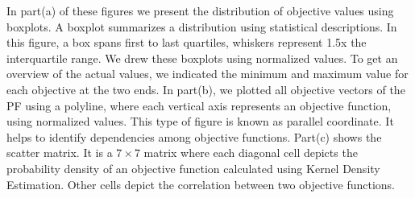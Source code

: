 In part(a) of these figures we present the distribution of objective values using boxplots. A boxplot summarizes a distribution using statistical descriptions. In this figure, a box spans first to last quartiles, whiskers represent 1.5x the interquartile range. We drew these boxplots using normalized values. To get an overview of the actual values, we indicated the minimum and maximum value for each objective at the two ends. In part(b), we plotted all objective vectors of the PF using a polyline, where each vertical axis represents an objective function, using normalized values. This type of figure is known as parallel coordinate. It helps to identify dependencies among objective functions. Part(c) shows the scatter matrix. It is a $7\times7$ matrix where each diagonal cell depicts the probability density of an objective function calculated using Kernel Density Estimation. Other cells depict the correlation between two objective functions.       

